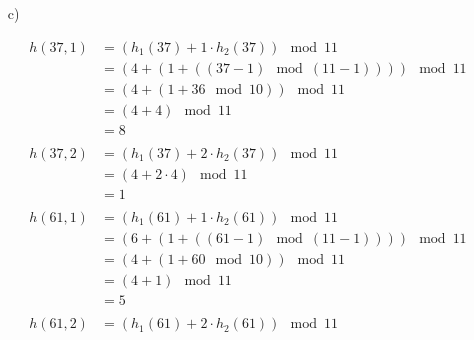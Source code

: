 \documentclass{article}
\begin{document}
\begin{enumerate}
        \item[c)]
        \begin{minipage}[t]{0.3 \textwidth}
        \end{minipage} 
        \begin{minipage}[t]{0.4\textwidth}
            \begin{align*}
                h(37, 1) &= (h_1(37) + 1\cdot h_2(37)) \mod{11} \\
                &= (4 + (1+ ((37 -1 ) \mod{(11-1)}))) \mod{11} \\
                &= (4 + (1 + 36 \mod{10})) \mod{11} \\
                &= (4 + 4) \mod{11} \\
                &= 8 \\\\
                h(37, 2) &= (h_1(37) + 2\cdot h_2(37)) \mod{11} \\
                &= (4 + 2 \cdot 4) \mod{11} \\
                &= 1 \\\\
                h(61, 1) &= (h_1(61) + 1\cdot h_2(61)) \mod{11} \\
                &= (6 + (1+ ((61 - 1) \mod{(11-1)}))) \mod{11} \\
                &= (4 + (1 + 60 \mod{10})) \mod{11} \\
                &= (4 + 1) \mod{11} \\
                &= 5 \\\\
                h(61, 2) &= (h_1(61) + 2\cdot h_2(61)) \mod{11} \\

\end{align*}
\end{minipage}
\end{enumerate}
\end{document}
